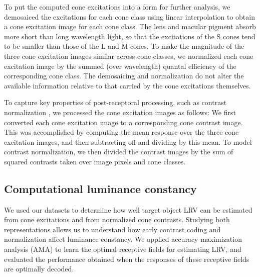 \documentclass{jov}
\begin{document}
To put the computed cone excitations into a form for further analysis, we demosaiced the excitations for each cone class using linear interpolation
to obtain a cone excitation image for each cone class.
The lens and macular pigment absorb more short than long wavelength light, so that the excitations of the S cones tend to be
smaller than those of the L and M cones.
To make the magnitude of the three cone excitation images similar across cone classes, we
normalized each cone excitation image by the summed (over wavelength) quantal efficiency of the corresponding cone class.
The demosaicing and normalization do not alter the available information relative to that carried by the cone excitations themselves. 

To capture key properties of post-receptoral processing, such as contrast normalization \cite{heeger1992normalization,albrecht1991motion,carandini2012normalization}, 
we processed the cone excitation images as follows:
We first converted each cone excitation image to a corresponding cone contrast image.
This was accomplished by computing the mean response over the three cone excitation images, and then subtracting off and dividing by this mean.
To model contrast normalization, we then divided the contrast images by the sum of squared contrasts taken over image pixels and cone classes.

\subsection{Computational luminance constancy} \label{method:SupervisedLearning}
We used our datasets to determine how well target object LRV can be estimated from cone excitations and from normalized cone contrasts.
Studying both representations allows us to understand how early contrast coding and normalization affect luminance constancy.
We applied accuracy maximization analysis (AMA) to learn the optimal receptive fields for estimating LRV,
and evaluated the performance obtained when the responses of these receptive fields are optimally decoded.
\end{document}
